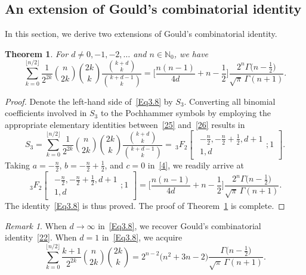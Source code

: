 \documentclass[reqno]{amsart}
\numberwithin{equation}{section}
\theoremstyle{plain}
\newtheorem{thm}{Theorem}[section]
\theoremstyle{remark}
\newtheorem{rem}{Remark}[section]
\begin{document}
\subsection{An extension of Gould's combinatorial identity}\label{sec5}

In this section, we derive two extensions of Gould's combinatorial identity.

\begin{thm}\label{thm3}
For $d\neq 0,-1,-2,\dotsc$ and $n\in\mathbb{N}_0$, we have
\begin{equation}\label{Eq3.8}
\sum_{k=0}^{\lfloor n/2\rfloor}\frac{1}{2^{2k}}\binom{n}{2k}\binom{2k}{k}\frac{\binom{k+d}{k}}{\binom{k+d-1}{k}}
=\biggl[\frac{n(n-1)}{4d}+n-\frac{1}{2}\biggr]\frac{2^n\Gamma\bigl(n-\frac{1}{2}\bigr)}{\sqrt{\pi}\,\Gamma(n+1)}.
\end{equation}
\end{thm}

\begin{proof}
Denote the left-hand side of~\eqref{Eq3.8} by $S_3$. Converting all binomial coefficients involved in $S_3$ to the Pochhammer symbols by employing the appropriate elementary identities between~\eqref{25} and~\eqref{26} results in
$$
S_3=\sum_{k=0}^{\lfloor n/2\rfloor}\frac{1}{2^{2k}}\binom{n}{2k}\binom{2k}{k}\frac{\binom{k+d}{k}}{\binom{k+d-1}{k}}
={\,}_3F_2\begin{bmatrix}\begin{gathered}-\tfrac{n}{2}, -\tfrac{n}2+\tfrac12, d+1\\ 1, d \end{gathered};1\end{bmatrix}.
$$
Taking $a=-\frac{n}2$, $b=-\frac{n}2+\frac12$, and $c=0$ in~\eqref{4}, we readily arrive at
\begin{equation*}
{\,}_3F_2\begin{bmatrix}\begin{gathered}-\tfrac{n}{2}, -\tfrac{n}2+\tfrac12, d+1\\ 1, d \end{gathered};1\end{bmatrix}
=\biggl[\frac{n(n-1)}{4d}+n-\frac{1}{2}\biggr]\frac{2^n\Gamma\bigl(n-\frac{1}{2}\bigr)}{\sqrt{\pi}\,\Gamma(n+1)}.
\end{equation*}
The identity~\eqref{Eq3.8} is thus proved. The proof of Theorem~\ref{thm3} is complete.
\end{proof}

\begin{rem}
When $d\to\infty$ in~\eqref{Eq3.8}, we recover Gould's combinatorial identity~\eqref{22}. When $d=1$ in~\eqref{Eq3.8}, we acquire
\begin{equation*}
\sum_{k=0}^{\lfloor n/2\rfloor}\frac{k+1}{2^{2k}}\binom{n}{2k}\binom{2k}{k}
=2^{n-2}\bigl(n^2+3n-2\bigr)\frac{\Gamma\bigl(n-\frac{1}{2}\bigr)}{\sqrt{\pi}\,\Gamma(n+1)}.
\end{equation*}
\end{rem}
\end{document}
